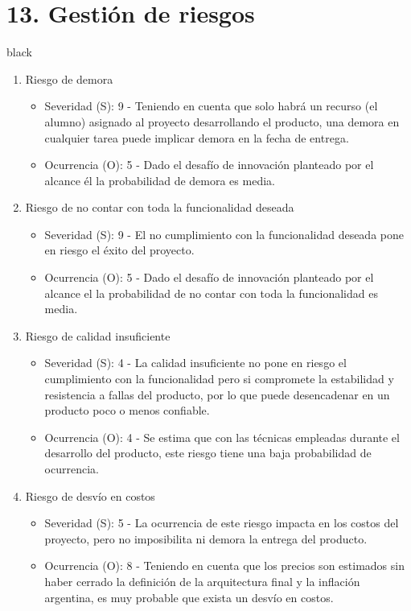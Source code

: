 \documentclass[
11pt, %
]{charter}
\begin{document}
\section{13. Gestión de riesgos}
\label{sec:riesgos}
\begin{consigna}{black}

\begin{enumerate}

\item Riesgo de demora
\begin{itemize}
	\item Severidad (S): 9 - Teniendo en cuenta que solo habrá un recurso (el alumno) asignado al proyecto desarrollando el producto, una demora en cualquier tarea puede implicar demora en la fecha de entrega.
	\item Ocurrencia (O): 5 - Dado el desafío de innovación planteado por el alcance él la probabilidad de demora es media.
\end{itemize}


\item Riesgo de no contar con toda la funcionalidad deseada
\begin{itemize}
	\item Severidad (S): 9 - El no cumplimiento con la funcionalidad deseada pone en riesgo el éxito del proyecto.
	\item Ocurrencia (O): 5 - Dado el desafío de innovación planteado por el alcance el la probabilidad de no contar con toda la funcionalidad es media.
\end{itemize}

\item Riesgo de calidad insuficiente
\begin{itemize}
	\item Severidad (S): 4 - La calidad insuficiente no pone en riesgo el cumplimiento con la funcionalidad pero si compromete la estabilidad y resistencia a fallas del producto, por lo que puede desencadenar en un producto poco o menos confiable.
	\item Ocurrencia (O): 4 - Se estima que con las técnicas empleadas durante el desarrollo del producto, este riesgo tiene una baja probabilidad de ocurrencia.
\end{itemize}


\item Riesgo de desvío en costos
\begin{itemize}
	\item Severidad (S): 5 - La ocurrencia de este riesgo impacta en los costos del proyecto, pero no imposibilita ni demora la entrega del producto.
	\item Ocurrencia (O): 8 - Teniendo en cuenta que los precios son estimados sin haber cerrado la definición de la arquitectura final y la inflación argentina, es muy probable que exista un desvío en costos.
\end{itemize}


\end{enumerate}
\end{consigna}
\end{document}
